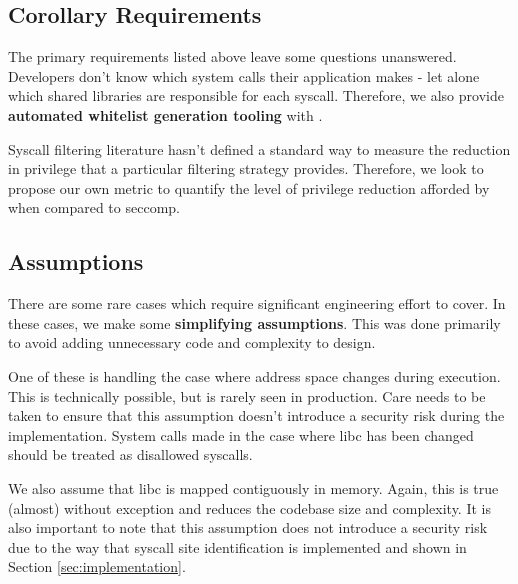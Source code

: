\subsection{Corollary Requirements} \label{subsubsec:corollary-reqs}

The primary requirements listed above leave some questions unanswered.
Developers don't know which system calls their application makes - let alone
which shared libraries are responsible for each syscall. Therefore, we also
provide \textbf{automated whitelist generation tooling} with \af. 

Syscall filtering literature hasn't defined a standard way to measure the
reduction in privilege that a particular filtering strategy provides. Therefore,
we look to propose our own metric to quantify the level of privilege reduction
afforded by \af when compared to seccomp.

\subsection{Assumptions}\label{subsec:assumptions}

There are some rare cases which require significant engineering effort to cover.
In these cases, we make some \textbf{simplifying assumptions}. This was done
primarily to avoid adding unnecessary code and complexity to \afg design. 
 
One of these is handling the case where  address space changes during
execution. This is technically possible, but is rarely seen in production.
Care needs to be taken to ensure that this assumption doesn't introduce a
security risk during the implementation. System calls made in the case where 
\ac{libc} has been changed should be treated as disallowed syscalls.


We also assume that \ac{libc} is mapped contiguously in memory. Again, this is
true (almost) without exception and reduces the codebase size and complexity.
It is also important to note that this assumption does not introduce a security
risk due to the way that syscall site identification is implemented and shown in
Section \ref{sec:implementation}. 

